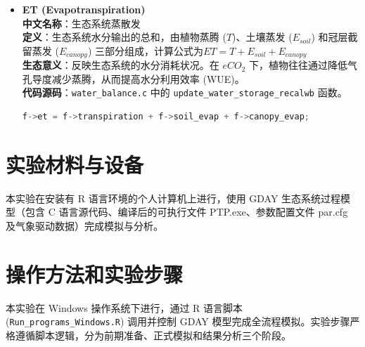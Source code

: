 \documentclass[10pt]{config}
\begin{document}
\begin{itemize}
\begin{lstlisting}[language=C]
    s->stem += f->cpstem - f->deadstems
\end{lstlisting}

\hspace{1em}

\item \textbf{ET (Evapotranspiration)} \\
\textbf{中文名称}：生态系统蒸散发 \\
\textbf{定义}：生态系统水分输出的总和，由植物蒸腾 ($T$)、土壤蒸发 ($E_{soil}$) 和冠层截留蒸发 ($E_{canopy}$) 三部分组成，计算公式为$ET = T + E_{soil} + E_{canopy}$ \\
\textbf{生态意义}：反映生态系统的水分消耗状况。在 $eCO_2$ 下，植物往往通过降低气孔导度减少蒸腾，从而提高水分利用效率 (WUE)。 \\
\textbf{代码源码}：\texttt{water\_balance.c} 中的 \texttt{update\_water\_storage\_recalwb} 函数。


\begin{lstlisting}[language=C]
    f->et = f->transpiration + f->soil_evap + f->canopy_evap;
\end{lstlisting}
\end{itemize}
\newpage

\section{实验材料与设备}

本实验在安装有 R 语言环境的个人计算机上进行，使用 GDAY 生态系统过程模型（包含 C 语言源代码、编译后的可执行文件 PTP.exe、参数配置文件 par.cfg 及气象驱动数据）完成模拟与分析。

\section{操作方法和实验步骤}

本实验在 Windows 操作系统下进行，通过 R 语言脚本 (\texttt{Run\_programs\_Windows.R}) 调用并控制 GDAY 模型完成全流程模拟。实验步骤严格遵循脚本逻辑，分为前期准备、正式模拟和结果分析三个阶段。
\end{document}
